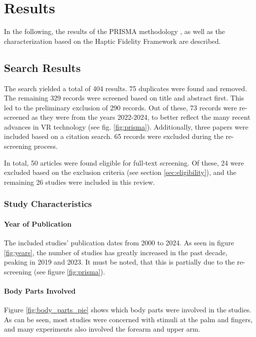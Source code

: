 \section{Results}
\label{sec:results}

In the following, the results of the PRISMA methodology \cite{Page2021TheReviews}, as well as the characterization based on the Haptic Fidelity Framework \cite{Muender2022HapticReality} are described.


\subsection{Search Results}

The search yielded a total of 404 results. 75 duplicates were found and removed. The remaining 329 records were screened based on title and abstract first. This led to the preliminary exclusion of 290 records. Out of these, 73 records were re-screened as they were from the years 2022-2024, to better reflect the many recent advances in VR technology (see fig. \ref{fig:prisma}). 
Additionally, three papers were included based on a citation search. 65 records were excluded during the re-screening process.

In total, 50 articles were found eligible for full-text screening. Of these, 24 were excluded based on the exclusion criteria (see section \ref{sec:eligibility}), and the remaining 26 studies were included in this review.


\subsubsection{Study Characteristics}
\paragraph{Year of Publication}
The included studies' publication dates from 2000 to 2024. As seen in figure \ref{fig:years}, the number of studies has greatly increased in the past decade, peaking in 2019 and 2023. It must be noted, that this is partially due to the re-screening (see figure \ref{fig:prisma}). 

\paragraph{Body Parts Involved}
Figure \ref{fig:body_parts_pie} shows which body parts were involved in the studies. As can be seen, most studies were concerned with stimuli at the palm and fingers, and many experiments also involved the forearm and upper arm.


